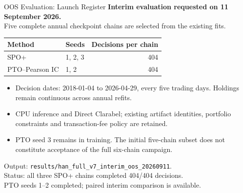 \documentclass[aspectratio=169,xcolor=dvipsnames]{beamer}
\begin{document}
\begin{frame}{OOS Evaluation: Launch Register}
    \footnotesize
    \textbf{Interim evaluation requested on 11 September 2026.}\\[2pt]
    Five complete annual checkpoint chains are selected from the existing fits.
    \vspace{2pt}
    \begin{table}
    \centering
    \begin{tabular}{l l r}
        \toprule
        Method & Seeds & Decisions per chain \\
        \midrule
        SPO+ & 1, 2, 3 & 404 \\
        PTO--Pearson IC & 1, 2 & 404 \\
        \bottomrule
    \end{tabular}
    \end{table}
    \begin{itemize}
        \item Decision dates: 2018-01-04 to 2026-04-29, every five trading days.
        Holdings remain continuous across annual refits.
        \item CPU inference and Direct Clarabel; existing artifact identities,
        portfolio constraints and transaction-fee policy are retained.
        \item PTO seed 3 remains in training. The initial five-chain subset
        does not constitute acceptance of the full six-chain campaign.
    \end{itemize}
    \vspace{4pt}
    \scriptsize Output: \texttt{results/han\_full\_v7\_interim\_oos\_20260911}.\\
    Status: all three SPO+ chains completed 404/404 decisions.\\
    PTO seeds 1--2 completed; paired interim comparison is available.
\end{frame}
\end{document}

